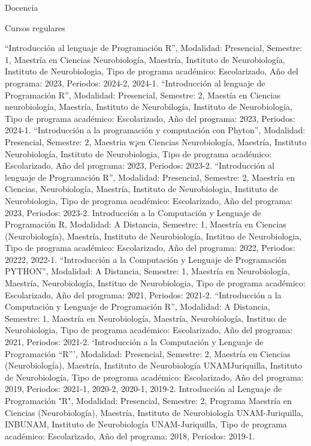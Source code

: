 Docencia

Cursos regulares

“Introducción al lenguaje de Programación R”, Modalidad: Presencial, Semestre: 1, Maestría en Ciencias Neurobiología, Maestría, Instituto de Neurobiología, Instituto de Neurobiologia, Tipo de programa académico: Escolarizado, Año del programa: 2023, Periodos: 2024-2, 2024-1.
“Introducción al lenguaje de Programación R”, Modalidad: Presencial, Semestre: 2, Maestía en Ciencias neurobiología, Maestría, Instituto de Neurobilogía, Instituto de Neurobiologia, Tipo de programa académico: Escolarizado, Año del programa: 2023, Periodos: 2024-1.
“Introducción a la programación y computación con Phyton”, Modalidad: Presencial, Semestre: 2, Maestria w¡en Ciencias Neurobiología, Maestría, Instituto Neurobiología, Instituto de Neurobiologia, Tipo de programa académico: Escolarizado, Año del programa: 2023, Periodos: 2023-2.
“Introducción al lenguaje de Programación R”, Modalidad: Presencial, Semestre: 2, Maestría en Ciencias, Neurobiología, Maestría, Instituto de Neurobiologia, Instituto de Neurobiologia, Tipo de programa académico: Escolarizado, Año del programa: 2023, Periodos: 2023-2.
Introducción a la Computación y Lenguaje de Programación R, Modalidad: A Distancia, Semestre: 1, Maestría en Ciencias (Neurobiología), Maestría, Instituto de Neurobiología, Instituo de Neurobiologia, Tipo de programa académico: Escolarizado, Año del programa: 2022, Periodos: 20222, 2022-1.
“Introducción a la Computación y Lenguaje de Programación PYTHON”, Modalidad: A Distancia, Semestre: 1, Maestría en Neurobiología, Maestría, Neurobiología, Instituo de Neurobiologia, Tipo de programa académico: Escolarizado, Año del programa: 2021, Periodos: 2021-2.
“Introducción a la Computación y Lenguaje de Programación R”, Modalidad: A Distancia, Semestre: 1, Maestría en Neurobiología, Maestría, Neurobiología, Instituo de Neurobiologia, Tipo de programa académico: Escolarizado, Año del programa: 2021, Periodos: 2021-2.
‘Introducción a la Computación y Lenguaje de Programación “R”’, Modalidad: Presencial, Semestre: 2, Maestría en Ciencias (Neurobiología), Maestría, Instituto de Neurobiología UNAMJuriquilla, Instituto de Neurobiología, Tipo de programa académico: Escolarizado, Año del programa: 2019, Periodos: 2021-1, 2020-2, 2020-1, 2019-2.
Introducción al Lenguaje de Programación "R", Modalidad: Presencial, Semestre: 2, Programa Maestría en Ciencias (Neurobiología), Maestría, Instituto de Neurobiología UNAM-Juriquilla, INBUNAM, Instituto de Neurobiología UNAM-Juriquilla, Tipo de programa académico: Escolarizado, Año del programa: 2018, Periodos: 2019-1.
